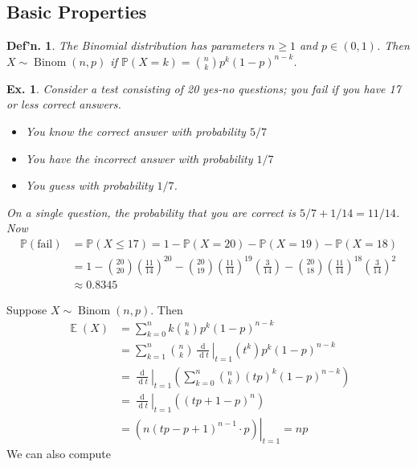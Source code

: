 \documentclass[12pt, a4paper]{book}
\DeclareMathOperator{\E}{\mathbb{E}}
\DeclareMathOperator{\Binom}{Binom}
\renewcommand{\Pr}{\mathbb{P}}
\renewcommand{\d}[1]{\ensuremath{\operatorname{d}\!{#1}}} %
\newtheorem{definition}[theorem]{Def'n.}
\newtheorem{example}[theorem]{Ex.}
\theoremstyle{nonumberplain}
\begin{document}
\subsection{Basic Properties}
\begin{definition}
    The Binomial distribution has parameters $n\geq 1$ and $p\in(0,1)$.
    Then $X\sim\Binom(n,p)$ if $\Pr(X=k)=\binom{n}{k}p^k(1-p)^{n-k}$.
\end{definition}
\begin{example}
    Consider a test consisting of 20 yes-no questions; you fail if you have 17 or less correct answers.
    \begin{itemize}[nolistsep]
        \item You know the correct answer with probability $5/7$
        \item You have the incorrect answer with probability $1/7$
        \item You guess with probability $1/7$.
    \end{itemize}
    On a single question, the probability that you are correct is $5/7+1/14=11/14$.
    Now
    \begin{align*}
        \Pr(\text{fail}) &= \Pr(X\leq 17) = 1-\Pr(X=20)-\Pr(X=19)-\Pr(X=18)\\
                         &= 1-\binom{20}{20}\left(\frac{11}{14}\right)^{20}-\binom{20}{19}\left(\frac{11}{14}\right)^{19}\left(\frac{3}{14}\right)-\binom{20}{18}\left(\frac{11}{14}\right)^{18}\left(\frac{3}{14}\right)^2\\
                         &\approx 0.8345
    \end{align*}
\end{example}
Suppose $X\sim\Binom(n,p)$.
Then
\begin{align*}
    \E(X) &= \sum\limits_{k=0}^nk\binom{n}{k}p^k(1-p)^{n-k}\\
          &= \sum\limits_{k=1}^n\binom{n}{k}\left.\frac{\d{}}{\d{t}}\right\rvert_{t=1}(t^k)p^k(1-p)^{n-k}\\
          &= \left.\frac{\d{}}{\d{t}}\right\rvert_{t=1}\left(\sum\limits_{k=0}^n\binom{n}{k}(tp)^k(1-p)^{n-k}\right)\\
          &= \left.\frac{\d{}}{\d{t}}\right\rvert_{t=1}\left((tp+1-p)^n\right)\\
          &= \left.\left(n(tp-p+1)^{n-1}\cdot p\right)\right\rvert_{t=1}=np
\end{align*}
We can also compute
\end{document}
